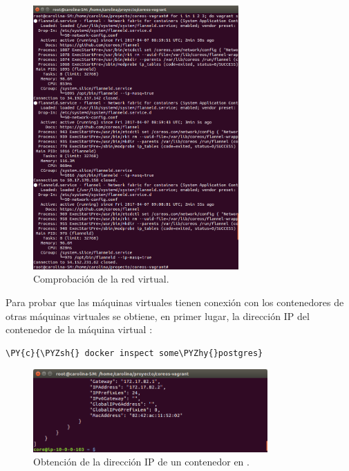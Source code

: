 \begin{figure}[H]
\centering
\includegraphics[width=0.7\textwidth]{images/figures/flanneld-aws-3.png}
\caption{Comprobación de la red virtual.}
\end{figure}

Para probar que las máquinas virtuales tienen conexión con los contenedores de otras máquinas virtuales se obtiene, en primer lugar, la dirección IP del contenedor  de la máquina virtual :

\begin{framed_shaded}
\begin{Verbatim}[fontsize=\relsize{-2.5},fontseries=b,commandchars=\\\{\}]
\PY{c}{\PYZsh{} docker inspect some\PYZhy{}postgres}
\end{Verbatim}
\end{framed_shaded}

\begin{figure}[H]
\centering
\includegraphics[width=0.8\textwidth]{images/figures/docker-inspect-3.png}
\caption{Obtención de la dirección IP de un contenedor en .}
\end{figure}

